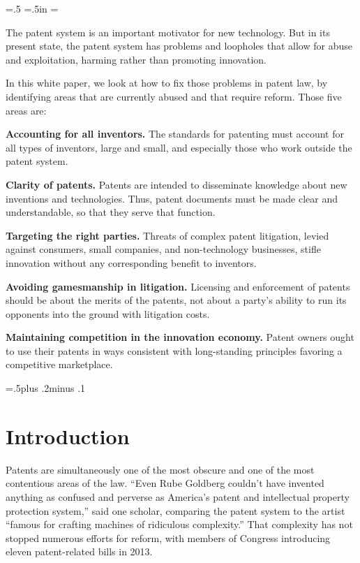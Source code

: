 \documentclass[11pt,twocolumn,titlepage]{article}
\begin{document}
\Large \parskip=.5\baselineskip \parindent=0pt
\leftskip=.5in \rightskip=\leftskip

The patent system is an important motivator for new technology. But in its
present state, the patent system has problems and loopholes that allow for abuse
and exploitation, harming rather than promoting innovation.

In this white paper, we look at how to fix those problems in patent law, by
identifying areas that are currently abused and that require reform. Those five
areas are:

\textbf{Accounting for all inventors.} The standards for patenting must account
for all types of inventors, large and small, and especially those who work
outside the patent system.

\textbf{Clarity of patents.} Patents are intended to disseminate knowledge about
new inventions and technologies. Thus, patent documents must be made clear and
understandable, so that they serve that function.

\textbf{Targeting the right parties.} Threats of complex patent litigation,
levied against consumers, small companies, and non-technology businesses, stifle
innovation without any corresponding benefit to inventors.

\textbf{Avoiding gamesmanship in litigation.} Licensing and enforcement of
patents should be about the merits of the patents, not about a party's
ability to run its opponents into the ground with litigation costs.

\textbf{Maintaining competition in the innovation economy.} Patent owners ought
to use their patents in ways consistent with long-standing principles favoring a
competitive marketplace.

\endgroup
\vfill

\hbox{}

\break

\tableofcontents
\clearpage
\twocolumn
{}

\parskip=.5\baselineskip plus .2\baselineskip minus .1\baselineskip

\section{Introduction}
\SectionNote
{}

Patents are simultaneously one of the most obscure and one of the most
contentious areas of the law. ``Even Rube Goldberg couldn't have invented
anything as confused and perverse as America's patent and intellectual property
protection system,'' said one scholar, comparing the patent system to the artist
``famous for crafting machines of ridiculous complexity.'' That
complexity has not stopped numerous efforts for reform, with members of Congress
introducing eleven patent-related bills in 2013.
\end{document}
